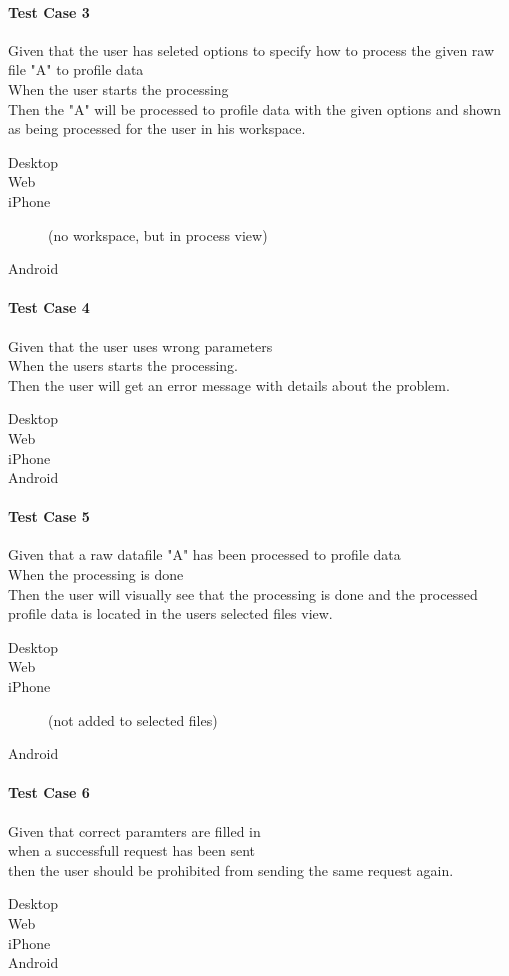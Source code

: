 \paragraph*{Test Case 3}
Given that the user has seleted options to specify how to process the given raw file "A" to profile data \\ When the user starts the processing \\ Then the "A" will be processed to profile data with the given options and shown as being processed for the user in his workspace.
\begin{description}
 \item[Desktop]
 \item[Web]
 \item[iPhone] \cmark (no workspace, but in process view)
 \item[Android]
\end{description}
\paragraph*{Test Case 4}
Given that the user uses wrong parameters \\ When the users starts the processing. \\ Then the user will get an error message with details about the problem.
\begin{description}
 \item[Desktop]
 \item[Web]
 \item[iPhone] \xmark
 \item[Android]
\end{description}
\paragraph*{Test Case 5}
Given that a raw datafile "A" has been processed to profile data \\ When the processing is done \\ Then the user will visually see that the processing is done and the processed profile data is located in the users selected files view.
\begin{description}
 \item[Desktop]
 \item[Web]
 \item[iPhone] \xmark (not added to selected files)
 \item[Android]
\end{description}
\paragraph*{Test Case 6}
Given that correct paramters are filled in \\ when a successfull request has been sent \\ then the user should be prohibited from sending the same request again.
\begin{description}
 \item[Desktop]
 \item[Web]
  \item[iPhone] \xmark
 \item[Android]
\end{description}
